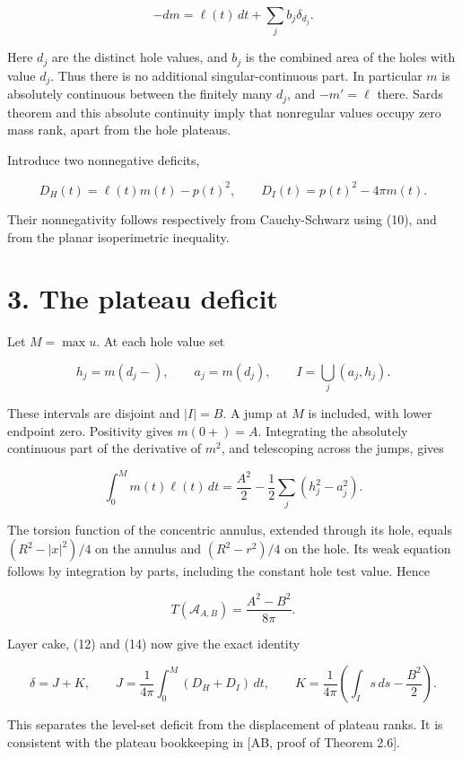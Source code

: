 \documentclass[11pt]{article}
\begin{document}
\[
-dm=\ell(t)\,dt+\sum_j b_j\delta_{d_j}.
\tag{11}
\]

Here \(d_j\) are the distinct hole values, and \(b_j\) is the combined
area of the holes with value \(d_j\). Thus there is no additional
singular-continuous part. In particular \(m\) is absolutely continuous
between the finitely many \(d_j\), and \(-m'=\ell\) there.
Sard\textquotesingle s theorem and this absolute continuity imply that
nonregular values occupy zero mass rank, apart from the hole plateaus.

Introduce two nonnegative deficits,

\[
D_H(t)=\ell(t)m(t)-p(t)^2,\qquad
D_I(t)=p(t)^2-4\pi m(t).
\tag{12}
\]

Their nonnegativity follows respectively from Cauchy-Schwarz using (10),
and from the planar isoperimetric inequality.

\section{3. The plateau deficit}\label{the-plateau-deficit}

Let \(M=\max u\). At each hole value set

\[
h_j=m(d_j-),\qquad a_j=m(d_j),\qquad
I=\bigcup_j(a_j,h_j).
\tag{13}
\]

These intervals are disjoint and \(|I|=B\). A jump at \(M\) is included,
with lower endpoint zero. Positivity gives \(m(0+)=A\). Integrating the
absolutely continuous part of the derivative of \(m^2\), and telescoping
across the jumps, gives

\[
\int_0^M m(t)\ell(t)\,dt
=\frac{A^2}{2}-\frac12\sum_j(h_j^2-a_j^2).
\tag{14}
\]

The torsion function of the concentric annulus, extended through its
hole, equals \((R^2-|x|^2)/4\) on the annulus and \((R^2-r^2)/4\) on the
hole. Its weak equation follows by integration by parts, including the
constant hole test value. Hence

\[
T(\mathcal A_{A,B})=\frac{A^2-B^2}{8\pi}.
\]

Layer cake, (12) and (14) now give the exact identity

\[
\delta=J+K,\qquad
J=\frac1{4\pi}\int_0^M(D_H+D_I)\,dt,\qquad
K=\frac1{4\pi}\left(\int_I s\,ds-\frac{B^2}{2}\right).
\tag{15}
\]

This separates the level-set deficit from the displacement of plateau
ranks. It is consistent with the plateau bookkeeping in {[}AB, proof of
Theorem 2.6{]}.
\end{document}

